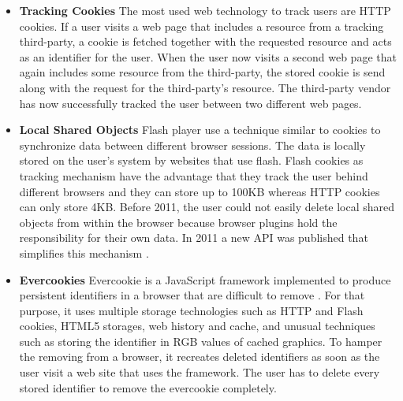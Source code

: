 	
%		
%		
	
	\begin{itemize}
		\item \textbf{Tracking Cookies} The most used web technology to track users are HTTP cookies. If a user visits a web page that includes a resource from a tracking third-party, a cookie is fetched together with the requested resource and acts as an identifier for the user. When the user now visits a second web page that again includes some resource from the third-party, the stored cookie is send along with the request for the third-party's resource. The third-party vendor has now successfully tracked the user between two different web pages.  
		
		\item \textbf{Local Shared Objects} Flash player use a technique similar to cookies to synchronize data between different browser sessions. The data is locally stored on the user's system by websites that use flash. Flash cookies as tracking mechanism have the advantage that they track the user behind different browsers and they can store up to 100KB whereas HTTP cookies can only store 4KB. Before 2011, the user could not easily delete local shared objects from within the browser because browser plugins hold the responsibility for their own data. In 2011 a new API was published that simplifies this mechanism \cite{mozillaWikiClearPrivacyAPI}. %
		
		\item \textbf{Evercookies} Evercookie is a JavaScript framework implemented to produce persistent identifiers in a browser that are difficult to remove \cite{evercookie}. For that purpose, it uses multiple storage technologies such as HTTP and Flash cookies, HTML5 storages, web history and cache, and unusual techniques such as storing the identifier in RGB values of cached graphics. To hamper the removing from a browser, it recreates deleted identifiers as soon as the user visit a web site that uses the framework. The user has to delete every stored identifier to remove the evercookie completely. 
	\end{itemize}
	
